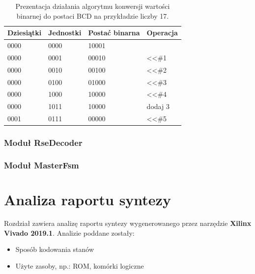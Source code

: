 \documentclass[12pt] {article}
\begin{document}
\begin{table}[H]
\centering
\caption{Prezentacja działania algorytmu konwersji wartości binarnej do postaci BCD na przykładzie liczby 17.}
\begin{tabular}{llll}
\toprule
\rowcolor[HTML]{ECF4FF} 
Dziesiątki                   & Jednostki                    & Postać binarna & Operacja                 \\ \midrule
0000                         & 0000                         & 10001          &                          \\
0000                         & 0001                         & 00010          & \textless{}\textless \#1 \\
0000                         & 0010                         & 00100          & \textless{}\textless \#2 \\
0000                         & 0100                         & 01000          & \textless{}\textless \#3 \\
0000                         & \cellcolor[HTML]{FFFFC7}1000 & 10000          & \textless{}\textless \#4 \\
0000                         & \cellcolor[HTML]{FFFFC7}1011 & 10000          & dodaj 3                  \\
\cellcolor[HTML]{9AFF99}0001 & \cellcolor[HTML]{9AFF99}0111 & 00000          & \textless{}\textless \#5 \\
\bottomrule  
\end{tabular}
\label{table:bcdexample}
\end{table}


\subsubsection{Moduł RseDecoder}

\subsubsection{Moduł MasterFsm}


\newpage
\section{Analiza raportu syntezy}

Rozdział zawiera analizę raportu syntezy wygenerowanego przez narzędzie \textbf{Xilinx Vivado 2019.1}. Analizie poddane zostały:
\begin{itemize}
\item Sposób kodowania stanów
\item Użyte zasoby, np.: ROM, komórki logiczne
\end{itemize}
\end{document}
